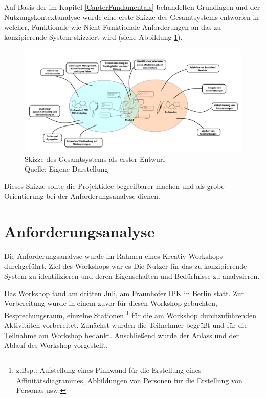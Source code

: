 Auf Basis der im Kapitel \ref{CapterFundamentals} behandelten Grundlagen und der Nutzungskontextanalyse wurde eine erste Skizze des Gesamtsystems entworfen in welcher, 
Funktionale wie Nicht-Funktionale Anforderungen an das zu konzipierende System skizziert wird (siehe Abbildung \ref{img:sysstem_sketch}).

\begin{figure}[H]
	\centering
	\includegraphics[width=1.0\textwidth]{resources/conception/skizze_gesamtsystem.png}
	\caption{Skizze des Gesamtsystems als erster Entwurf \\Quelle: Eigene Darstellung}
	\label{img:sysstem_sketch}
\end{figure}

Dieses Skizze sollte die Projektidee begreifbarer machen und als grobe Orientierung bei der Anforderungsanalyse dienen.

\section{Anforderungsanalyse}

Die Anforderungsanalyse wurde im Rahmen eines Kreativ Workshops durchgeführt. Ziel des Workshops war es Die Nutzer für das zu konzipierende System zu identifizieren und deren Eigenschaften und Bedürfnisse 
zu analysieren. 

Das Workshop fand am dritten Juli, am Fraunhofer IPK in Berlin statt. Zur Vorbereitung wurde in einem zuvor für diesen Workshop gebuchten, Besprechungsraum, einzelne Stationen \footnote{z.Bsp.: Aufstellung eines Pinnwand für die Erstellung eines Affinitätsdiagrammes, Abbildungen von Personen für die Erstellung von Personas usw.} für die am Workshop durchzuführenden Aktivitäten vorbereitet. 
Zunächst wurden die Teilnehmer begrüßt und für die Teilnahme am Workshop bedankt. Anschließend wurde der Anlass und der Ablauf des Workshop vorgestellt. 

